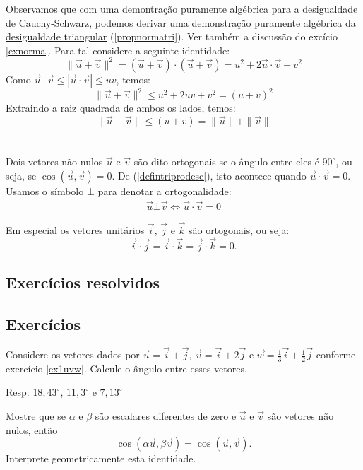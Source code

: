 Observamos que com uma demontração puramente algébrica para a desigualdade de Cauchy-Schwarz, podemos derivar uma demonstração puramente algébrica da \underline{desigualdade triangular} (\ref{propnormatri}). Ver também a discussão do excício \ref{exnorma}. Para tal considere a seguinte identidade:
$$\|\vec{u}+\vec{v}\|^2=\left(\vec{u}+\vec{v}\right)\cdot \left(\vec{u}+\vec{v}\right) = u^2+2\vec{u}\cdot\vec{v}+v^2$$
Como $\vec{u}\cdot\vec{v}\leq |\vec{u}\cdot\vec{v}|\leq uv$, temos:
$$\|\vec{u}+\vec{v}\|^2\leq u^2+2uv+v^2=(u+v)^2$$
Extraindo a raiz quadrada de ambos os lados, temos:
$$\|\vec{u}+\vec{v}\|\leq (u+v)=\|\vec{u}\|+\|\vec{v}\|$$
\\~\\
Dois vetores não nulos $\vec{u}$ e $\vec{v}$ são dito ortogonais se o ângulo entre eles é $90^\circ$, ou seja, se $\cos\left(\vec{u},\vec{v}\right)=0$. De (\ref{defintriprodesc}), isto acontece quando $\vec{u}\cdot\vec{v}=0$. Usamos o símbolo $\bot$ para denotar a ortogonalidade:
\begin{eqnarray}\vec{u}\bot \vec{v}\Longleftrightarrow \vec{u}\cdot\vec{v}=0\label{deforto}
\end{eqnarray}

Em especial os vetores unitários $\vec{i}$, $\vec{j}$ e $\vec{k}$ são ortogonais, ou seja: $$\vec{i}\cdot \vec{j}=\vec{i}\cdot \vec{k}=\vec{j}\cdot \vec{k}=0.$$

\subsection*{Exercícios resolvidos}

\construirExeresol

\subsection*{Exercícios}
\begin{exer} Considere os vetores dados por $\vec{u}=\vec{i}+\vec{j}$, $\vec{v}=\vec{i}+2\vec{j}$ e $\vec{w}=\frac{1}{3}\vec{i}+\frac{1}{2}\vec{j}$ conforme exercício \ref{ex1uvw}. Calcule o ângulo entre esses vetores.  
\end{exer}
Resp: $18,43^\circ$, $11,3^\circ$ e  $7,13^\circ$
\begin{exer} Mostre que se $\alpha$ e $\beta$ são escalares diferentes de zero e $\vec{u}$ e $\vec{v}$ são vetores não nulos, então $$\cos\left(\alpha\vec{u},\beta\vec{v}\right)=\cos\left(\vec{u},\vec{v}\right).$$
Interprete geometricamente esta identidade.
\end{exer}


